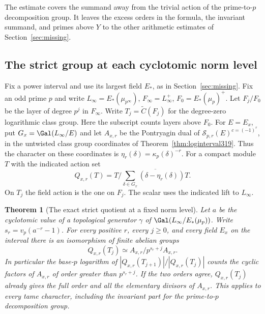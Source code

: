 \documentclass[a4paper,11pt]{article}
\newtheorem{theorem}[proposition]{Theorem}
\theoremstyle{definition}
\theoremstyle{remark}
\numberwithin{equation}{section}
\begin{document}
The estimate covers the summand away from the trivial action
of the prime-to-\(p\) decomposition group. It leaves the excess
orders in the formula, the invariant summand, and primes above
\(Y\) to the other arithmetic estimates of Section~\ref{sec:missing}.

\subsection{The strict group at each cyclotomic norm level}\label{nav:specialization329}
Fix a power interval and use its largest field \(E_*\), as in
Section~\ref{sec:missing}. Fix an odd prime \(p\) and write
\(L_\infty=E_*(\mu_{p^\infty})\), \(F_\infty=L_\infty^+\),
\(F_0=E_*(\mu_p)^+\). Let \(F_j/F_0\) be the layer of degree
\(p^j\) in \(F_\infty\). Write \(T_j=\widetilde C(F_j)\) for
the degree-zero logarithmic class group. Here the subscript counts
layers above \(F_0\). For \(E=E_x\), put \(G_x=\Gal(L_\infty/E)\)
and let \(A_{x,r}\) be the Pontryagin dual of
\(\mathcal S_{p,r}(E)^{c=(-1)^r}\), in the untwisted class group
coordinates of Theorem~\ref{thm:loginterval319}. Thus the character
on these coordinates is \(\eta_r(\delta)=\kappa_p(\delta)^{-r}\).
For a compact module \(T\) with the indicated action set
\[
 Q_{x,r}(T)=T\big/
 \overline{\sum_{\delta\in G_x}(\delta-\eta_r(\delta))T}.
\]
On \(T_j\) the field action is the one on \(F_j\). The scalar uses
the indicated lift to \(L_\infty\).

\begin{theorem}[The exact strict quotient at a fixed norm level]\leavevmode
\label{thm:strictdigits329}
Let \(a\) be the cyclotomic value of a topological generator \(\gamma\)
of \(\Gal(L_\infty/E_*(\mu_p))\). Write \(s_r=v_p(a^{-r}-1)\).
For every positive \(r\), every \(j\ge0\), and every field \(E_x\)
on the interval there is an isomorphism of finite abelian groups
\begin{equation}\label{eq:strictdigits329}
 Q_{x,r}(T_j)\simeq A_{x,r}/p^{s_r+j}A_{x,r}.
\end{equation}
In particular the base-\(p\) logarithm of
\( |Q_{x,r}(T_{j+1})|/|Q_{x,r}(T_j)|\) counts the cyclic factors
of \(A_{x,r}\) of order greater than \(p^{s_r+j}\).
If the two orders agree, \(Q_{x,r}(T_j)\) already gives the full
order and all the elementary divisors of \(A_{x,r}\).
This applies to every tame character, including the invariant part
for the prime-to-\(p\) decomposition group.
\end{theorem}
\end{document}
